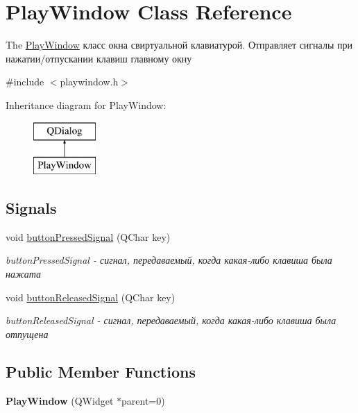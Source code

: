 \hypertarget{class_play_window}{}\section{Play\+Window Class Reference}
\label{class_play_window}


The \hyperlink{class_play_window}{Play\+Window} класс окна свиртуальной клавиатурой. Отправляет сигналы при нажатии/отпускании клавиш главному окну  




{\ttfamily \#include $<$playwindow.\+h$>$}

Inheritance diagram for Play\+Window\+:\begin{figure}[H]
\begin{center}
\leavevmode
\includegraphics[height=2.000000cm]{class_play_window}
\end{center}
\end{figure}
\subsection*{Signals}
\begin{DoxyCompactItemize}
\item 
void \hyperlink{class_play_window_ae629638312cf77e32ca2d681988f67bb}{button\+Pressed\+Signal} (Q\+Char key)
\begin{DoxyCompactList}\small\item\em button\+Pressed\+Signal -\/ сигнал, передаваемый, когда какая-\/либо клавиша была нажата \end{DoxyCompactList}\item 
void \hyperlink{class_play_window_a4cc0e9d4e067da86aaf025c2863da5d6}{button\+Released\+Signal} (Q\+Char key)
\begin{DoxyCompactList}\small\item\em button\+Released\+Signal -\/ сигнал, передаваемый, когда какая-\/либо клавиша была отпущена \end{DoxyCompactList}\end{DoxyCompactItemize}
\subsection*{Public Member Functions}
\begin{DoxyCompactItemize}
\item 
\mbox{\label{class_play_window_ad88fb98822ab0c52b76e4005dfd10647}} 
{\bfseries Play\+Window} (Q\+Widget $\ast$parent=0)
\end{DoxyCompactItemize}
